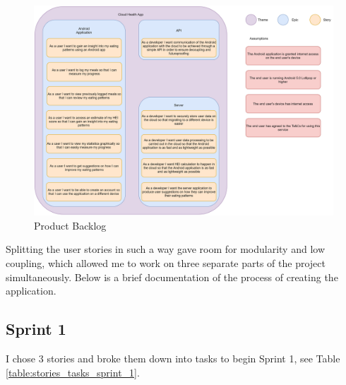 \documentclass{article}
\begin{document}
\bigskip
\begin{figure}[h]
\hspace*{-1.5cm} 
\includegraphics[width=1.3\textwidth]{backlog.png}
\centering
\caption{Product Backlog}
\label{fig:product_backlog}
\end{figure}

\bigskip
\noindent Splitting the user stories in such a way gave room for modularity and low coupling, which allowed me to work on three separate parts of the project simultaneously. Below is a brief documentation of the process of creating the application. 

\newpage
\subsection{Sprint 1}
I chose 3 stories and broke them down into tasks to begin Sprint 1, see Table \ref{table:stories_tasks_sprint_1}. 
\end{document}

